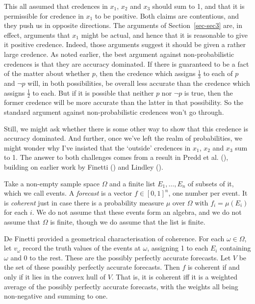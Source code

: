 \documentclass[
  11pt,
  letterpaper,
  DIV=11,
  numbers=noendperiod,
  twoside]{scrartcl}
\begin{document}
This all assumed that credences in \(x_1\), \(x_2\) and \(x_3\) should
sum to 1, and that it is permissible for credence in \(x_1\) to be
positive. Both claims are contentious, and they push us in opposite
directions. The arguments of Section~\ref{sec-sec3} are, in effect,
arguments that \(x_1\) might be actual, and hence that it is reasonable
to give it positive credence. Indeed, those arguments suggest it should
be given a rather large credence. As noted earlier, the best argument
against non-probabilistic credences is that they are accuracy dominated.
If there is guaranteed to be a fact of the matter about whether \(p\),
then the credence which assigns \(\frac{1}{3}\) to each of \(p\) and
\(\neg p\) will, in both possibilities, be overall less accurate than
the credence which assigns \(\frac{1}{2}\) to each. But if it is
possible that neither \(p\) nor \(\neg p\) is true, then the former
credence will be more accurate than the latter in that possibility. So
the standard argument against non-probabilistic credences won't go
through.

Still, we might ask whether there is some other way to show that this
credence is accuracy dominated. And further, once we've left the realm
of probabilities, we might wonder why I've insisted that the `outside'
credences in \(x_1\), \(x_2\) and \(x_3\) sum to 1. The answer to both
challenges comes from a result in Predd et al.
(), building on earlier work by Finetti
() and Lindley
().

Take a non-empty sample space \(\Omega\) and a finite list
\(E_1, \ldots, E_n\) of subsets of it, which we call events. A
\emph{forecast} is a vector \(f \in
[0,1]^n\), one number per event. It is \emph{coherent} just in case
there is a probability measure \(\mu\) over \(\Omega\) with
\(f_i = \mu(E_i)\) for each \(i\). We do not assume that these events
form an algebra, and we do not assume that \(\Omega\) is finite, though
we do assume that the list is finite.

De Finetti provided a geometrical characterisation of coherence. For
each \(\omega \in \Omega\), let \(v_\omega\) record the truth values of
the events at \(\omega\), assigning 1 to each \(E_i\) containing
\(\omega\) and 0 to the rest. These are the possibly perfectly accurate
forecasts. Let \(V\) be the set of these possibly perfectly accurate
forecasts. Then \(f\) is coherent if and only if it lies in the convex
hull of \(V\). That is, it is coherent iff it is a weighted average of
the possibly perfectly accurate forecasts, with the weights all being
non-negative and summing to one.
\end{document}
